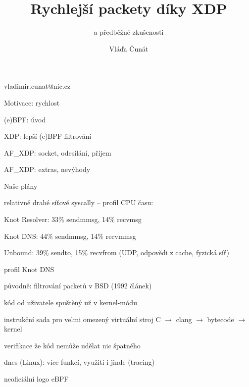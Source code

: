 
\czechenv

\pageAspectRatio[16:9]

\title{Rychlejší packety díky XDP}
\subtitle{a předběžné zkušenosti \hfill{}}
\author{Vláďa Čunát}{vladimir.cunat@nic.cz}
\date[2019-10-01]


\slide[Přehled]

\bulletList
\item Motivace: rychlost
\item (e)BPF: úvod
\item XDP: lepší (e)BPF filtrování
\item AF\_XDP: socket, odesílání, příjem
\item AF\_XDP: extras, nevýhody
\item Naše plány
\endBulletList



relativně drahé síťové syscally -- profil CPU času:
\bulletList
\item Knot Resolver: 33\% sendmmsg, 14\% recvmsg
\item Knot DNS: 44\% sendmmsg, 14\% recvmmsg
\item Unbound: 39\% sendto, 15\% recvfrom
\endBulletList
(UDP, odpovědi z cache, fyzická síť)

\rightColumn
\bigskip
\hfill{}profil Knot DNS\par
\hfill{}
\endColumn



\bulletList
\item původně: filtrování packetů v BSD (1992 článek)
\item kód od uživatele spuštěný už v kernel-módu
\item instrukční sada pro velmi omezený virtuální stroj
C $\to$ clang $\to$ bytecode $\to$ kernel
\item verifikace že kód nemůže udělat nic špatného
\item dnes (Linux): více funkcí, využití i jinde (tracing)
\endBulletList

\rightColumn
\bigskip
\hfill{}\par
\hfill{}neoficiální logo eBPF
\endColumn


